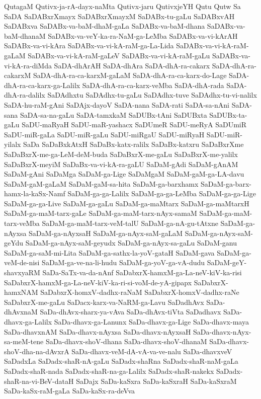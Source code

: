 {QutagaM
Qutivx-ja-rA-dayx-naMta
Qutivx-jaru
QutivxjeYH
Qutu
Qutw
Sa
SaDA
SaDABxrXmayx
SaDABxrXmayxM
SaDABx-tu-gaLu
SaDABxvAH
SaDABxva
SaDABx-va-baM-dhaM-gaLa
SaDABx-va-baM-dhana
SaDABx-va-baM-dhanaM
SaDABx-va-veY-ka-ra-NaM-ga-LeMba
SaDABx-va-vi-kArAH
SaDABx-va-vi-kAra
SaDABx-va-vi-kA-raM-ga-La-Lida
SaDABx-va-vi-kA-raM-gaLaM
SaDABx-va-vi-kA-raM-gaLeV
SaDABx-va-vi-kA-raM-gaLu
SaDABx-va-vi-kA-ra-diMda
SaDA-dhArAH
SaDA-dhAra
SaDA-dhA-ra-cakarx
SaDA-dhA-ra-cakarxM
SaDA-dhA-ra-ca-karxM-gaLaM
SaDA-dhA-ra-ca-karx-do-Lage
SaDA-dhA-ra-ca-karx-ga-Lalilx
SaDA-dhA-ra-ca-karx-veMba
SaDA-dhA-rada
SaDA-dhA-ra-dalilx
SaDAdhxtu
SaDAdhx-tu-gaLu
SaDAdhx-tuve
SaDAdhx-tu-vi-nalilx
SaDA-hu-raM-gAni
SaDAjx-dayoV
SaDA-nana
SaDA-rati
SaDA-sa-nAni
SaDA-sana
SaDA-sa-na-gaLu
SaDA-tamxkaM
SaDUBx-tAni
SaDUBxta
SaDUBx-ta-gaLu
SaDU-maRyaH
SaDU-maR-yashacx
SaDUmeR
SaDU-meRyA
SaDUmiR
SaDU-miR-gaLa
SaDU-miR-gaLu
SaDU-miRgaU
SaDU-miRyaH
SaDU-miR-yilalx
SaDa
SaDaBxkAtxH
SaDaBx-katx-ralilx
SaDaBx-katxru
SaDaBxrXme
SaDaBxrX-me-ga-LeM-deM-buda
SaDaBxrX-me-gaLu
SaDaBxrX-me-yalilx
SaDaBxrX-meyiM
SaDaBx-va-vi-kA-ra-gaLU
SaDaM-gAdi
SaDaM-gAnAM
SaDaM-gAni
SaDaMga
SaDaM-ga-Lige
SaDaMgaM
SaDaM-gaM-ga-LA-davu
SaDaM-gaM-gaLaM
SaDaM-gaM-sa-hita
SaDaM-ga-barxhamx
SaDaM-ga-barx-hamx-la-kaSx-Namf
SaDaM-ga-ga-Lalilx
SaDaM-ga-ga-LeMba
SaDaM-ga-ga-Lige
SaDaM-ga-ga-Live
SaDaM-ga-gaLu
SaDaM-ga-maMtarx
SaDaM-ga-maMtarxH
SaDaM-ga-maM-tarx-gaLe
SaDaM-ga-maM-tarx-nAyx-samaM
SaDaM-ga-maM-tarx-veMba
SaDaM-ga-maM-tarx-veM-talU
SaDaM-ga-nA-gu-tAtxne
SaDaM-ga-nAyxsa
SaDaM-ga-nAyxsaH
SaDaM-ga-nAyx-saM-gaLaM
SaDaM-ga-nAyx-saM-geYdu
SaDaM-ga-nAyx-saM-geyudx
SaDaM-ga-nAyx-sa-gaLu
SaDaM-ganu
SaDaM-ga-saM-mi-Lita
SaDaM-ga-sathx-la-yoV-gataH
SaDaM-gava
SaDaM-ga-veM-de-nisi
SaDaM-ga-ve-na-li-hudu
SaDaM-ga-yoV-ga-vA-dudu
SaDaM-geY-shavxyaRM
SaDa-SaTx-va-da-nAnf
SaDabxrX-hamxM-ga-La-neV-kiV-ka-risi
SaDabxrX-hamxM-ga-La-neV-kiV-ka-ri-si-voM-de-yA-gipapx
SaDabxrX-hamxNAM
SaDabxrX-homxV-dadhx-raNaM
SaDabxrX-homxV-dadhx-raNe
SaDabxrX-me-gaLu
SaDacx-karx-va-NaRM-ga-Lavu
SaDadhAvx
SaDa-dhAvxnaM
SaDa-dhAvx-sharx-ya-vAva
SaDa-dhAvx-tiVta
SaDadhavx
SaDa-dhavx-ga-Lalilx
SaDa-dhavx-ga-Lanunx
SaDa-dhavx-ga-Lige
SaDa-dhavx-maya
SaDa-dhavxnAM
SaDa-dhavx-nAyxsa
SaDa-dhavx-nAyxsaH
SaDa-dhavx-nAyx-sa-meM-tene
SaDa-dhavx-shoV-dhana
SaDa-dhavx-shoV-dhanaM
SaDa-dhavx-shoV-dha-na-dAvxrA
SaDa-dhavx-veM-dA-vA-va-ve-nalu
SaDa-dhavxveV
SaDadxLa
SaDadx-shaR-nA-gaLu
SaDadx-shaRna
SaDadx-shaR-naM-gaLa
SaDadx-shaR-nada
SaDadx-shaR-na-ga-Lalilx
SaDadx-shaR-nakekx
SaDadx-shaR-na-vi-BeV-dataH
SaDajx
SaDa-kaSxra
SaDa-kaSxraH
SaDa-kaSxraM
SaDa-kaSx-raM-gaLa
SaDa-kaSx-ra-deVva
}
